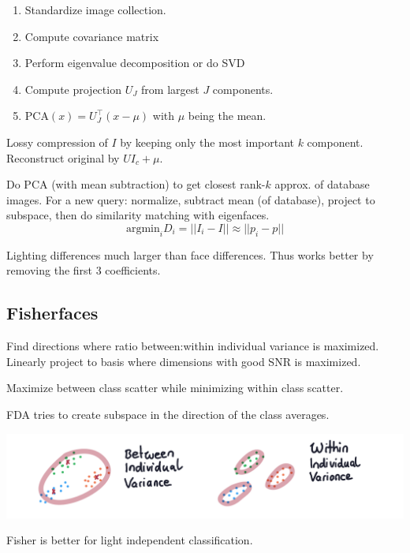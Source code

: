 \begin{definition}
  \begin{enumerate}
    \item Standardize image collection.
    \item Compute covariance matrix
    \item Perform eigenvalue decomposition or do SVD
    \item Compute projection \(U_J\) from largest \(J\) components.
    \item \(\text{PCA}(x) = U_J^\top(x - \mu)\) with \(\mu\) being the mean.
  \end{enumerate}
\end{definition}

\begin{definition}
  Lossy compression of \(I\) by keeping only the most important \(k\) component. Reconstruct original by \(UI_c + \mu\).
\end{definition}

\begin{algorithm}
  Do PCA (with mean subtraction) to get closest rank-\(k\) approx. of database images. For a new query: normalize, subtract mean (of database), project to subspace, then do similarity matching with eigenfaces.
  \[\text{argmin}_i D_i = ||I_i - I|| \approx ||p_i - p||\]
\end{algorithm}

\begin{theorem}
  Lighting differences much larger than face differences. Thus works better by removing the first 3 coefficients.
\end{theorem}

\subsection{Fisherfaces}
Find directions where ratio between:within individual variance is maximized. Linearly project to basis where dimensions with good SNR is maximized.

\begin{algorithm}
  Maximize between class scatter while minimizing within class scatter.
\end{algorithm}

FDA tries to create subspace in the direction of the class averages.

\includegraphics*[width=\linewidth]{assets/variances.png}

Fisher is better for light independent classification.
